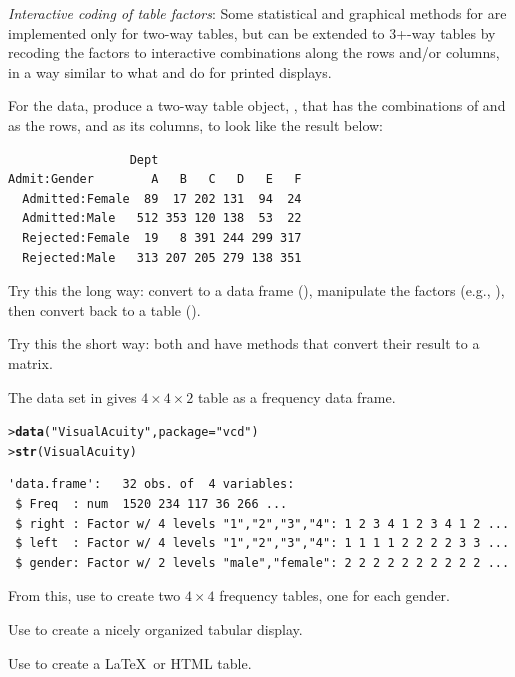 \documentclass[10pt,krantz2]{krantz}\usepackage[]{graphicx}\usepackage[]{color}
\makeatletter
\newcommand{\hlstr}[1]{\textcolor[rgb]{0.192,0.494,0.8}{#1}}%
\newcommand{\hlstd}[1]{\textcolor[rgb]{0.345,0.345,0.345}{#1}}%
\newcommand{\hlkwc}[1]{\textcolor[rgb]{0.333,0.667,0.333}{#1}}%
\newcommand{\hlkwd}[1]{\textcolor[rgb]{0.737,0.353,0.396}{\textbf{#1}}}%
\newenvironment{kframe}{%
 \def\at@end@of@kframe{}%
 \ifinner\ifhmode%
  \def\at@end@of@kframe{\end{minipage}}%
  \begin{minipage}{\columnwidth}%
 \fi\fi%
 \def\FrameCommand##1{\hskip\@totalleftmargin \hskip-\fboxsep
 \colorbox{shadecolor}{##1}\hskip-\fboxsep
     \hskip-\linewidth \hskip-\@totalleftmargin \hskip\columnwidth}%
 \MakeFramed {\advance\hsize-\width
   \@totalleftmargin\z@ \linewidth\hsize
   \@setminipage}}%
 {\par\unskip\endMakeFramed%
 \at@end@of@kframe}
\newenvironment{knitrout}{}{} %
\renewenvironment{knitrout}{\small\renewcommand{\baselinestretch}{.85}}{} %
\makeatother
\begin{document}
\begin{Exercises}
\exercise\hard \emph{Interactive coding of table factors}:  Some statistical and graphical
methods for \ctabs are implemented only for two-way tables, but can be extended
to 3+-way tables by recoding the factors to interactive combinations along the
rows and/or columns, in a way similar to what  and 
do for printed displays.

For the  data, produce a two-way table object, ,
that has the combinations of  and  as the rows, and
 as its columns, to look like the result below:
\begin{verbatim}
                 Dept
Admit:Gender        A   B   C   D   E   F
  Admitted:Female  89  17 202 131  94  24
  Admitted:Male   512 353 120 138  53  22
  Rejected:Female  19   8 391 244 299 317
  Rejected:Male   313 207 205 279 138 351
\end{verbatim}
  \begin{enumerate*}
    \item Try this the long way:  convert  to a data frame (),
    manipulate the factors (e.g., ), then convert back to
a table ().
    \item Try this the short way:  both  and  have 
    methods that convert their result to a matrix.
  \end{enumerate*}

\exercise The data set  in  gives $4 \times 4 \times 2$
table as a frequency data frame.
\begin{knitrout}
\color{fgcolor}\begin{kframe}
\begin{alltt}
\hlstd{> }\hlkwd{data}\hlstd{(}\hlstr{"VisualAcuity"}\hlstd{,} \hlkwc{package}\hlstd{=}\hlstr{"vcd"}\hlstd{)}
\hlstd{> }\hlkwd{str}\hlstd{(VisualAcuity)}
\end{alltt}
\begin{verbatim}
'data.frame':	32 obs. of  4 variables:
 $ Freq  : num  1520 234 117 36 266 ...
 $ right : Factor w/ 4 levels "1","2","3","4": 1 2 3 4 1 2 3 4 1 2 ...
 $ left  : Factor w/ 4 levels "1","2","3","4": 1 1 1 1 2 2 2 2 3 3 ...
 $ gender: Factor w/ 2 levels "male","female": 2 2 2 2 2 2 2 2 2 2 ...
\end{verbatim}
\end{kframe}
\end{knitrout}
  \begin{enumerate*}
    \item From this, use  to create two $4\times 4$ frequency tables, one for
each gender.
    \item Use  to create a nicely organized tabular display.
    \item Use  to create a \LaTeX\ or HTML table.
  \end{enumerate*}

\end{Exercises}
\end{document}
